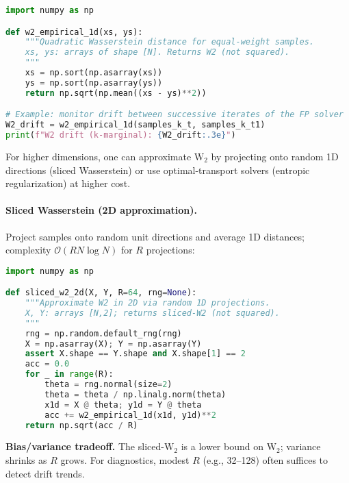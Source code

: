 ﻿\documentclass[11pt,letterpaper,oneside]{article}
\numberwithin{equation}{section}
\newcommand{\1}{\mathbf{1}}
\begin{document}
\begin{lstlisting}[language=Python,caption={Empirical $\mathrm W_2$ in 1D via sorting (equal weights)}]
import numpy as np

def w2_empirical_1d(xs, ys):
    """Quadratic Wasserstein distance for equal-weight samples.
    xs, ys: arrays of shape [N]. Returns W2 (not squared).
    """
    xs = np.sort(np.asarray(xs))
    ys = np.sort(np.asarray(ys))
    return np.sqrt(np.mean((xs - ys)**2))

# Example: monitor drift between successive iterates of the FP solver
W2_drift = w2_empirical_1d(samples_k_t, samples_k_t1)
print(f"W2 drift (k-marginal): {W2_drift:.3e}")
\end{lstlisting}

For higher dimensions, one can approximate $\mathrm W_2$ by projecting onto random 1D directions (sliced Wasserstein) or use optimal-transport solvers (entropic regularization) at higher cost.

\paragraph{Sliced Wasserstein (2D approximation).}
Project samples onto random unit directions and average 1D distances; complexity $\mathcal O(R N\log N)$ for $R$ projections:

\begin{lstlisting}[language=Python,caption={Sliced $\mathrm W_2$ for 2D (equal weights)}]
import numpy as np

def sliced_w2_2d(X, Y, R=64, rng=None):
    """Approximate W2 in 2D via random 1D projections.
    X, Y: arrays [N,2]; returns sliced-W2 (not squared).
    """
    rng = np.random.default_rng(rng)
    X = np.asarray(X); Y = np.asarray(Y)
    assert X.shape == Y.shape and X.shape[1] == 2
    acc = 0.0
    for _ in range(R):
        theta = rng.normal(size=2)
        theta = theta / np.linalg.norm(theta)
        x1d = X @ theta; y1d = Y @ theta
        acc += w2_empirical_1d(x1d, y1d)**2
    return np.sqrt(acc / R)
\end{lstlisting}

\begin{tcolorbox}[mathstyle]
\textbf{Bias/variance tradeoff.} The sliced-$\mathrm W_2$ is a lower bound on $\mathrm W_2$; variance shrinks as $R$ grows. For diagnostics, modest $R$ (e.g., 32--128) often suffices to detect drift trends.
\end{tcolorbox}

\end{document}
